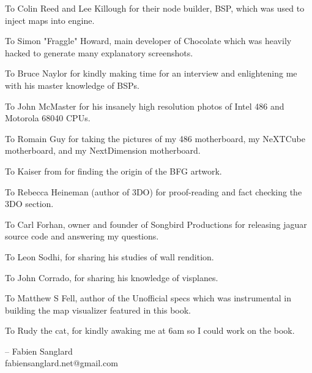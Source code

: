 \par
To Colin Reed and Lee Killough for their node builder, BSP, which was used to inject maps into \doom{} engine.\\
\par
To Simon "Fraggle" Howard, main developer of Chocolate \doom{} which was heavily hacked to generate many explanatory screenshots.\\
\par
To Bruce Naylor for kindly making time for an interview and enlightening me with his master knowledge of BSPs.\\
\par
To John McMaster for his insanely high resolution photos of Intel 486 and Motorola 68040 CPUs.\\
\par
To Romain Guy for taking the pictures of my 486 motherboard, my NeXTCube motherboard, and my NextDimension motherboard.\\
\par
To Kaiser from  for finding the origin of the BFG artwork.\\
\par
To Rebecca Heineman (author of \doom{} 3DO) for proof-reading and fact checking the 3DO section.\\
\par
To Carl Forhan, owner and founder of Songbird Productions for releasing \doom{} jaguar source code and answering my questions.\\
\par
To Leon Sodhi, for sharing his studies of \doom{} wall rendition.\\
\par
To John Corrado, for sharing his knowledge of visplanes.\\
\par
To Matthew S Fell, author of the Unofficial \doom{} specs which was instrumental in building the map visualizer featured in this book.\\
\par
To Rudy the cat, for kindly awaking me at 6am so I could work on the book.\\
\par
-- Fabien Sanglard\\
fabiensanglard.net@gmail.com

